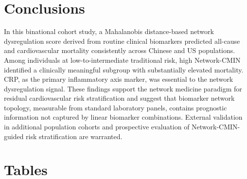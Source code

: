 \documentclass[11pt,a4paper]{article}
\begin{document}
\section{Conclusions}

In this binational cohort study, a Mahalanobis distance-based network dysregulation score derived from routine clinical biomarkers predicted all-cause and cardiovascular mortality consistently across Chinese and US populations. Among individuals at low-to-intermediate traditional risk, high Network-CMIN identified a clinically meaningful subgroup with substantially elevated mortality. CRP, as the primary inflammatory axis marker, was essential to the network dysregulation signal. These findings support the network medicine paradigm for residual cardiovascular risk stratification and suggest that biomarker network topology, measurable from standard laboratory panels, contains prognostic information not captured by linear biomarker combinations. External validation in additional population cohorts and prospective evaluation of Network-CMIN-guided risk stratification are warranted.

\newpage

\section*{Tables}
\end{document}

